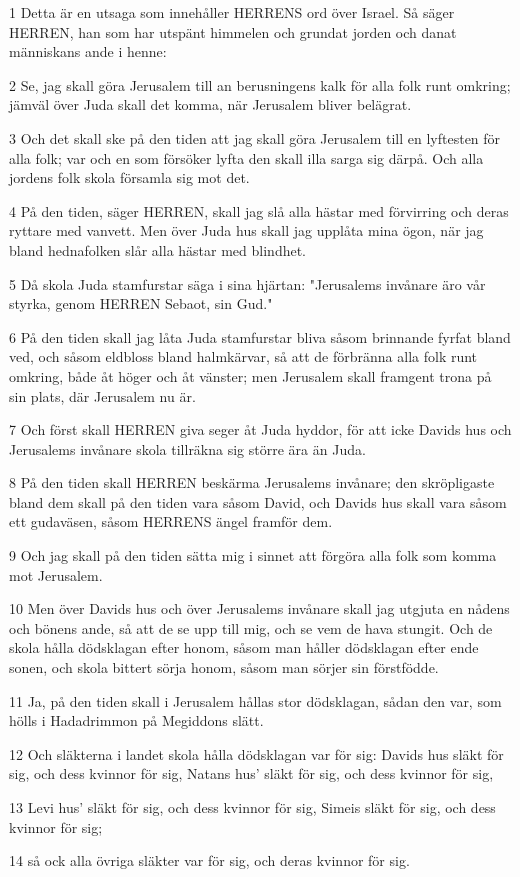 \par 1 Detta är en utsaga som innehåller HERRENS ord över Israel. Så säger HERREN, han som har utspänt himmelen och grundat jorden och danat människans ande i henne:
\par 2 Se, jag skall göra Jerusalem till an berusningens kalk för alla folk runt omkring; jämväl över Juda skall det komma, när Jerusalem bliver belägrat.
\par 3 Och det skall ske på den tiden att jag skall göra Jerusalem till en lyftesten för alla folk; var och en som försöker lyfta den skall illa sarga sig därpå. Och alla jordens folk skola församla sig mot det.
\par 4 På den tiden, säger HERREN, skall jag slå alla hästar med förvirring och deras ryttare med vanvett. Men över Juda hus skall jag upplåta mina ögon, när jag bland hednafolken slår alla hästar med blindhet.
\par 5 Då skola Juda stamfurstar säga i sina hjärtan: "Jerusalems invånare äro vår styrka, genom HERREN Sebaot, sin Gud."
\par 6 På den tiden skall jag låta Juda stamfurstar bliva såsom brinnande fyrfat bland ved, och såsom eldbloss bland halmkärvar, så att de förbränna alla folk runt omkring, både åt höger och åt vänster; men Jerusalem skall framgent trona på sin plats, där Jerusalem nu är.
\par 7 Och först skall HERREN giva seger åt Juda hyddor, för att icke Davids hus och Jerusalems invånare skola tillräkna sig större ära än Juda.
\par 8 På den tiden skall HERREN beskärma Jerusalems invånare; den skröpligaste bland dem skall på den tiden vara såsom David, och Davids hus skall vara såsom ett gudaväsen, såsom HERRENS ängel framför dem.
\par 9 Och jag skall på den tiden sätta mig i sinnet att förgöra alla folk som komma mot Jerusalem.
\par 10 Men över Davids hus och över Jerusalems invånare skall jag utgjuta en nådens och bönens ande, så att de se upp till mig, och se vem de hava stungit. Och de skola hålla dödsklagan efter honom, såsom man håller dödsklagan efter ende sonen, och skola bittert sörja honom, såsom man sörjer sin förstfödde.
\par 11 Ja, på den tiden skall i Jerusalem hållas stor dödsklagan, sådan den var, som hölls i Hadadrimmon på Megiddons slätt.
\par 12 Och släkterna i landet skola hålla dödsklagan var för sig: Davids hus släkt för sig, och dess kvinnor för sig, Natans hus' släkt för sig, och dess kvinnor för sig,
\par 13 Levi hus' släkt för sig, och dess kvinnor för sig, Simeis släkt för sig, och dess kvinnor för sig;
\par 14 så ock alla övriga släkter var för sig, och deras kvinnor för sig.

